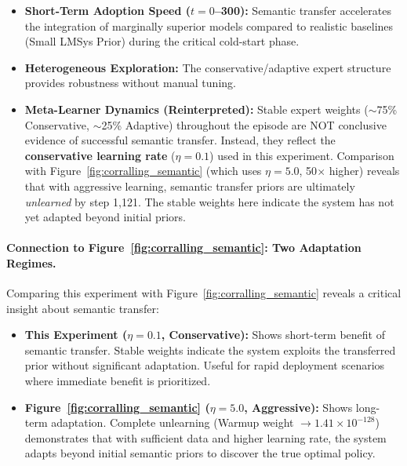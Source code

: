 \begin{itemize}
    \item \textbf{Short-Term Adoption Speed ($t=0$--300):} Semantic transfer accelerates the integration of marginally superior models compared to realistic baselines (Small LMSys Prior) during the critical cold-start phase.
    
    \item \textbf{Heterogeneous Exploration:} The conservative/adaptive expert structure provides robustness without manual tuning.
    
    \item \textbf{Meta-Learner Dynamics (Reinterpreted):} Stable expert weights ($\sim$75\% Conservative, $\sim$25\% Adaptive) throughout the episode are NOT conclusive evidence of successful semantic transfer. Instead, they reflect the \textbf{conservative learning rate} ($\eta=0.1$) used in this experiment. Comparison with Figure~\ref{fig:corralling_semantic} (which uses $\eta=5.0$, 50$\times$ higher) reveals that with aggressive learning, semantic transfer priors are ultimately \emph{unlearned} by step 1,121. The stable weights here indicate the system has not yet adapted beyond initial priors.
\end{itemize}

\paragraph{Connection to Figure~\ref{fig:corralling_semantic}: Two Adaptation Regimes.}
Comparing this experiment with Figure~\ref{fig:corralling_semantic} reveals a critical insight about semantic transfer:

\begin{itemize}
    \item \textbf{This Experiment ($\eta=0.1$, Conservative):} Shows short-term benefit of semantic transfer. Stable weights indicate the system exploits the transferred prior without significant adaptation. Useful for rapid deployment scenarios where immediate benefit is prioritized.
    
    \item \textbf{Figure~\ref{fig:corralling_semantic} ($\eta=5.0$, Aggressive):} Shows long-term adaptation. Complete unlearning (Warmup weight $\to 1.41 \times 10^{-128}$) demonstrates that with sufficient data and higher learning rate, the system adapts beyond initial semantic priors to discover the true optimal policy.
\end{itemize}

